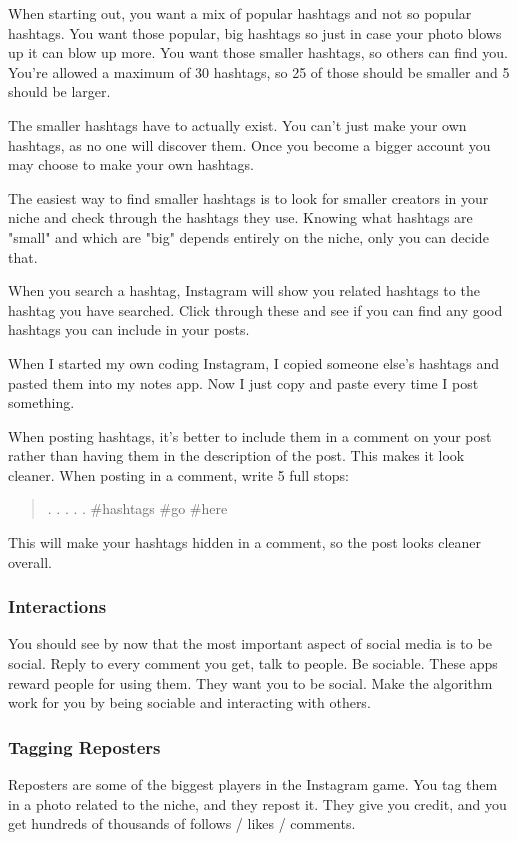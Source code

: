 \documentclass{article}
\begin{document}
When starting out, you want a mix of popular hashtags and not so popular
hashtags. You want those popular, big hashtags so just in case your
photo blows up it can blow up more. You want those smaller hashtags, so
others can find you. You're allowed a maximum of 30 hashtags, so 25 of
those should be smaller and 5 should be larger.

The smaller hashtags have to actually exist. You can't just make your
own hashtags, as no one will discover them. Once you become a bigger
account you may choose to make your own hashtags.

The easiest way to find smaller hashtags is to look for smaller creators
in your niche and check through the hashtags they use. Knowing what
hashtags are "small" and which are "big" depends entirely on the
niche, only you can decide that.

When you search a hashtag, Instagram will show you related hashtags to
the hashtag you have searched. Click through these and see if you can
find any good hashtags you can include in your posts.

When I started my own coding Instagram, I copied someone else's hashtags
and pasted them into my notes app. Now I just copy and paste every time
I post something.

When posting hashtags, it's better to include them in a comment on your
post rather than having them in the description of the post. This makes
it look cleaner. When posting in a comment, write 5 full stops:
\begin{quote}
.
.
.
.
.
\#hashtags \#go \#here
\end{quote}

This will make your hashtags hidden in a comment, so the post looks
cleaner overall.
\subsubsection{Interactions}
You should see by now that the most important aspect of social media is
to be social. Reply to every comment you get, talk to people. Be
sociable. These apps reward people for using them. They want you to be
social. Make the algorithm work for you by being sociable and
interacting with others.
\subsubsection{Tagging Reposters}
Reposters are some of the biggest players in the Instagram game. You tag
them in a photo related to the niche, and they repost it. They give you
credit, and you get hundreds of thousands of follows / likes / comments.
\end{document}
